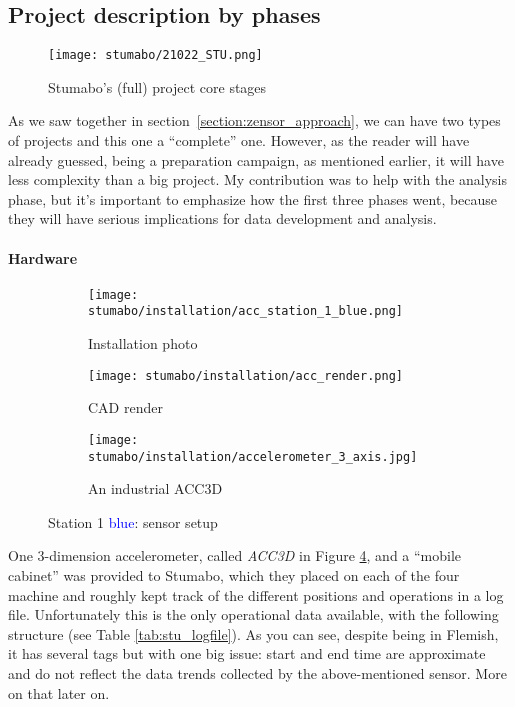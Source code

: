 \subsection{Project description by phases}
\begin{figure}[ht]
    \texttt{[image: stumabo/21022\_STU.png]}
    \caption{Stumabo's (full) project core stages}
    \label{fig:stumabo_stages}
\end{figure}
As we saw together in section~\ref{section:zensor_approach}, we can have two types of projects and this one a ``complete'' one.
However, as the reader will have already guessed, being a preparation campaign, as mentioned earlier, it will have less complexity than a big project.
My contribution was to help with the analysis phase, but it's important to emphasize how the first three phases went, because they will have serious implications for data development and analysis.

\paragraph{Hardware} 
\begin{figure}[ht]
    \begin{subfigure}{0.33\textwidth}
        \centering
        \texttt{[image: stumabo/installation/acc\_station\_1\_blue.png]}
        \caption{Installation photo}
        \label{fig:s1b_foto}
    \end{subfigure}
    \begin{subfigure}{0.33\textwidth}
        \centering
        \texttt{[image: stumabo/installation/acc\_render.png]}
        \caption{CAD render}
        \label{fig:s1b_render}
    \end{subfigure}
    \begin{subfigure}{0.32\textwidth}
        \centering
        \texttt{[image: stumabo/installation/accelerometer\_3\_axis.jpg]}
        \caption{An industrial ACC3D}
        \label{fig:stumabo_acc3d}
    \end{subfigure}
    \caption{Station 1 \textcolor{blue}{blue}: sensor setup}
    \label{fig:stu_station1_b}
\end{figure}
One 3-dimension accelerometer, called \textit{ACC3D} in Figure \ref{fig:stumabo_acc3d}, and a ``mobile cabinet'' was provided to Stumabo, 
which they placed on each of the four machine and roughly kept track of the different positions and operations in a log file.
Unfortunately this is the only operational data available, with the following structure (see Table \ref{tab:stu_logfile}).
As you can see, despite being in Flemish, it has several tags but with one big issue: start and end time are approximate and do not reflect the data trends collected by the above-mentioned sensor.
More on that later on. 

